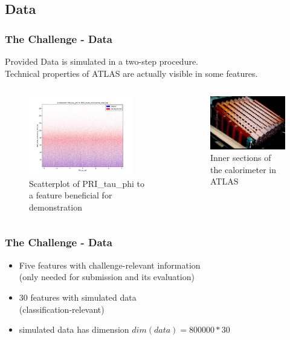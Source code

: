	\subsection{Data}
	\begin{frame}
		\frametitle{The Challenge - Data}
		
		Provided Data is simulated in a two-step procedure.\\
		Technical properties of ATLAS are actually visible in some features.
		
		\begin{columns}			
				\begin{figure}
					\centering
					\includegraphics[width=130pt]{images/PRI_tau_phi}
					\caption{Scatterplot of PRI\_tau\_phi to a feature 
							 beneficial for demonstration}
				\end{figure}
								
				\begin{figure}
					\centering
					\includegraphics[width=130pt]{images/calo}
					\caption{Inner sections of the calorimeter in ATLAS
						\cite{ATLASpage}}
				\end{figure}
		\end{columns}			

	\end{frame}
		
	\begin{frame}
		\frametitle{The Challenge - Data}
		\begin{itemize}
			\item Five features with challenge-relevant information\\
				  (only needed for submission and its evaluation)
			\item 30 features with simulated data \\
				  (classification-relevant)
			\item simulated data has dimension $ dim(data)=800000*30 $
			
		\end{itemize}
	\end{frame}
		
